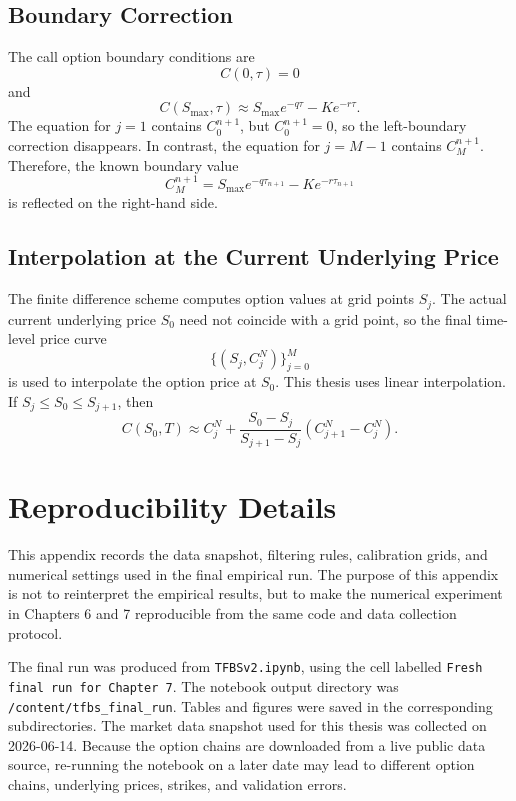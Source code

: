 \documentclass[11pt,a4paper]{report}
\begin{document}
\section{Boundary Correction}

The call option boundary conditions are
\[
C(0,\tau)=0
\]
and
\[
C(S_{\max},\tau)
\approx
S_{\max}e^{-q\tau}
-
Ke^{-r\tau}.
\]
The equation for $j=1$ contains $C_0^{n+1}$, but $C_0^{n+1}=0$, so the left-boundary correction disappears. In contrast, the equation for $j=M-1$ contains $C_M^{n+1}$. Therefore, the known boundary value
\[
C_M^{n+1}
=
S_{\max}e^{-q\tau_{n+1}}
-
Ke^{-r\tau_{n+1}}
\]
is reflected on the right-hand side.

\section{Interpolation at the Current Underlying Price}

The finite difference scheme computes option values at grid points $S_j$. The actual current underlying price $S_0$ need not coincide with a grid point, so the final time-level price curve
\[
\{(S_j,C_j^N)\}_{j=0}^{M}
\]
is used to interpolate the option price at $S_0$. This thesis uses linear interpolation. If $S_j\le S_0\le S_{j+1}$, then
\[
C(S_0,T)
\approx
C_j^N
+
\frac{S_0-S_j}{S_{j+1}-S_j}
\left(
C_{j+1}^N-C_j^N
\right).
\]

\chapter{Reproducibility Details}
\label{app:reproducibility}

This appendix records the data snapshot, filtering rules, calibration grids, and numerical settings used in the final empirical run. The purpose of this appendix is not to reinterpret the empirical results, but to make the numerical experiment in Chapters 6 and 7 reproducible from the same code and data collection protocol.

The final run was produced from \texttt{TFBSv2.ipynb}, using the cell labelled \texttt{Fresh final run for Chapter 7}. The notebook output directory was \texttt{/content/tfbs\_final\_run}. Tables and figures were saved in the corresponding subdirectories. The market data snapshot used for this thesis was collected on 2026-06-14. Because the option chains are downloaded from a live public data source, re-running the notebook on a later date may lead to different option chains, underlying prices, strikes, and validation errors.
\end{document}
